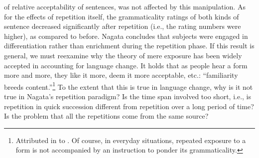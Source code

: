 of relative acceptability of sentences, was not affected by this manipulation. As for the effects of repetition itself, the grammaticality ratings of both kinds of sentence decreased significantly after repetition (i.e., the rating numbers were higher), as compared to before. Nagata concludes that subjects were engaged in differentiation rather than enrichment during the repetition phase. If this result is general, we must reexamine why the theory of mere exposure has been widely accepted in accounting for language change. It holds that as people hear a form more and more, they like it more, deem it more acceptable, etc.: ``familiarity breeds content.''\footnote{Attributed in \citet{BradacEtAl1980} to \citet{Walker1973}. Of course, in everyday situations, repeated exposure to a form is not accompanied by an instruction to ponder its grammaticality.}
To the extent that this is true in language change, why is it not true in Nagata's repetition paradigm? Is the time span involved too short, i.e., is repetition in quick succession different from repetition over a long period of time? Is the problem that all the repetitions come from the same source?

